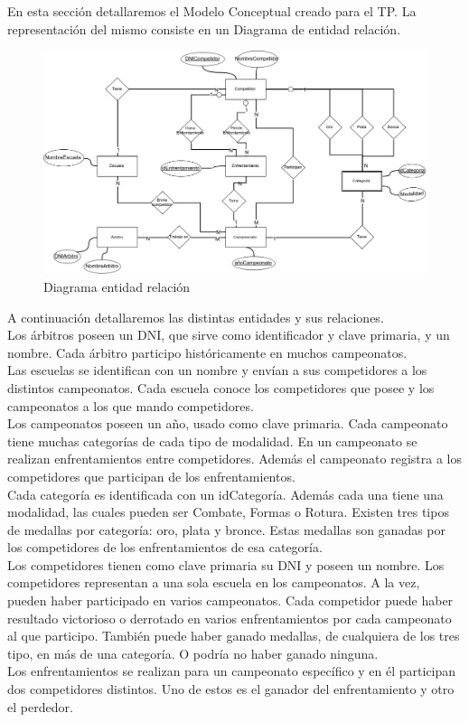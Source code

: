 En esta sección detallaremos el Modelo Conceptual creado para el TP. La representación del mismo consiste en un Diagrama
de entidad relación.

\begin{figure}[H]
  \centering
    \includegraphics[scale=0.4]{imagenes/DER.png}
  \caption{Diagrama entidad relación}
\end{figure}

A continuación detallaremos las distintas entidades y sus relaciones.\\

Los árbitros poseen un DNI, que sirve como identificador y clave primaria, y un nombre. Cada árbitro participo históricamente
en muchos campeonatos.\\

Las escuelas se identifican con un nombre y envían a sus competidores a los distintos campeonatos. Cada escuela conoce los competidores
que posee y los campeonatos a los que mando competidores.\\

Los campeonatos poseen un año, usado como clave primaria. Cada campeonato tiene muchas categorías de cada tipo de modalidad.
En un campeonato se realizan enfrentamientos entre competidores. Además el campeonato registra a los competidores que
participan de los enfrentamientos.\\

Cada categoría es identificada con un idCategoría. Además cada una tiene una modalidad, las cuales pueden ser
Combate, Formas o Rotura. Existen tres tipos de medallas por categoría: oro, plata y bronce. Estas medallas son ganadas
por los competidores de los enfrentamientos de esa categoría.\\

Los competidores tienen como clave primaria su DNI y poseen un nombre. Los competidores representan a una sola escuela en
los campeonatos. A la vez, pueden haber participado en varios campeonatos. Cada competidor puede haber resultado victorioso
o derrotado en varios enfrentamientos por cada campeonato al que participo. También puede haber ganado medallas, de
cualquiera de los tres tipo, en más de una categoría. O podría no haber ganado ninguna.\\

Los enfrentamientos se realizan para un campeonato específico y en él participan dos competidores distintos. Uno de estos
es el ganador del enfrentamiento y otro el perdedor.
